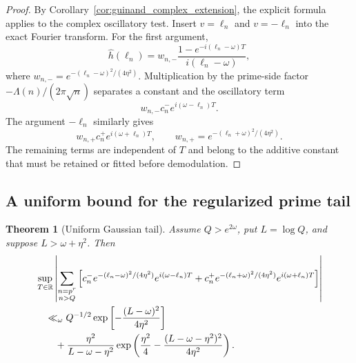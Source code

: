 \documentclass[11pt]{amsart}
\numberwithin{equation}{section}
\theoremstyle{plain}
\newtheorem{theorem}{Theorem}[section]
\theoremstyle{definition}
\theoremstyle{remark}
\newcommand{\1}{\mathbf{1}}
\begin{document}
\begin{proof}
By Corollary~\ref{cor:guinand_complex_extension}, the explicit formula
applies to the complex oscillatory test.  Insert \(v=\ell_n\) and
\(v=-\ell_n\) into the exact Fourier transform.
For the first argument,
\begin{equation}
\widehat h(\ell_n)
=
w_{n,-}
\frac{1-e^{-i(\ell_n-\omega)T}}
{i(\ell_n-\omega)},
\label{eq:branch_minus_fourier_insert}
\end{equation}
where \(w_{n,-}=e^{-(\ell_n-\omega)^2/(4\eta^2)}\).  Multiplication by the
prime-side factor \(-\Lambda(n)/(2\pi\sqrt n)\) separates a constant and
the oscillatory term
\begin{equation}
w_{n,-}c_n^-e^{i(\omega-\ell_n)T}.
\label{eq:branch_minus_oscillatory_proof}
\end{equation}
The argument \(-\ell_n\) similarly gives
\begin{equation}
w_{n,+}c_n^+e^{i(\omega+\ell_n)T},
\qquad
w_{n,+}=e^{-(\ell_n+\omega)^2/(4\eta^2)}.
\label{eq:branch_plus_oscillatory_proof}
\end{equation}
The remaining terms are independent of \(T\) and belong to the additive
constant that must be retained or fitted before demodulation.
\end{proof}

\subsection{A uniform bound for the regularized prime tail}
\label{subsec:regularized_tail_bound}

\begin{theorem}[Uniform Gaussian tail]
\label{thm:uniform_gaussian_tail}
Assume \(Q>e^{2\omega}\), put \(L=\log Q\), and suppose
\(L>\omega+\eta^2\).  Then
\begin{align}
&\sup_{T\in\mathbb R}
\left|
\sum_{\substack{n=p^r\\n>Q}}
\left[
 c_n^-e^{-(\ell_n-\omega)^2/(4\eta^2)}e^{i(\omega-\ell_n)T}
+c_n^+e^{-(\ell_n+\omega)^2/(4\eta^2)}e^{i(\omega+\ell_n)T}
\right]
\right|
\notag
\\
&\quad\ll_\omega
Q^{-1/2}
\exp\left[-\frac{(L-\omega)^2}{4\eta^2}\right]
\label{eq:uniform_gaussian_tail_endpoint}
\\
&\qquad+
\frac{\eta^2}{L-\omega-\eta^2}
\exp\left(
\frac{\eta^2}{4}
-
\frac{(L-\omega-\eta^2)^2}{4\eta^2}
\right).
\label{eq:uniform_gaussian_tail}
\end{align}
\end{theorem}
\end{document}
